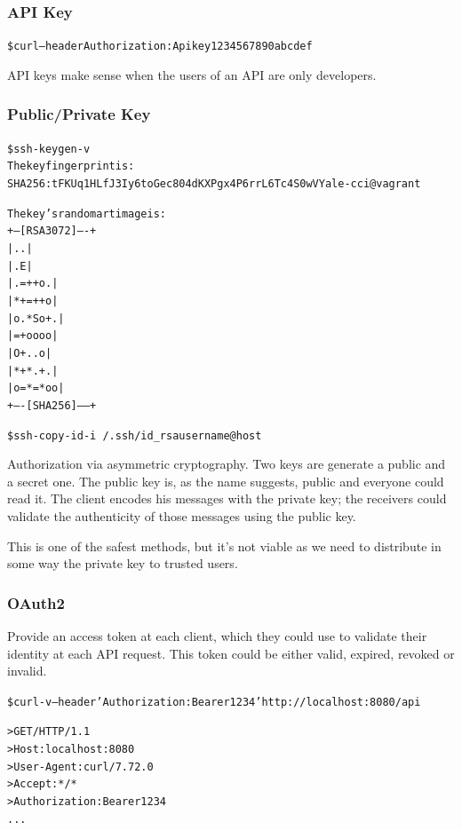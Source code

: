 \documentclass{style}
\begin{document}
\subsubsection{API Key}
\begin{alltt}
    \$ curl --header Authorization: Apikey 1234567890abcdef
\end{alltt}
API keys make sense when the users of an API are only developers.

\subsubsection{Public/Private Key}
\begin{alltt}
    \$ ssh-keygen -v
    The key fingerprint is:
    SHA256:tFKUq1HLfJ3Iy6toGec804dKXPgx4P6rrL6Tc4S0wVY ale-cci@vagrant

    The key's randomart image is:
    +---[RSA 3072]----+
    |        ..       |
    |       .E        |
    |     . =++ o .   |
    |      *+=++ o    |
    |     o.*So+.     |
    |      =+oooo     |
    |       O+..o     |
    |      *+*.+ .    |
    |     o=*=*oo     |
    +----[SHA256]-----+


    \$ ssh-copy-id -i ~/.ssh/id_rsa username@host
\end{alltt}
Authorization via asymmetric cryptography. Two keys are generate a public and a secret one.
The public key is, as the name suggests, public and everyone could read it.
The client encodes his messages with the private key; the receivers could validate the authenticity of those messages using the public key.

This is one of the safest methods, but it's not viable as we need to distribute in some way the private key to
trusted users.

\subsubsection{OAuth2}
Provide an access token at each client, which they could use to validate their
identity at each API request.  This token could be either valid, expired,
revoked or invalid.

\begin{alltt}
    \$ curl -v --header 'Authorization: Bearer 1234' http://localhost:8080/api

    > GET / HTTP/1.1
    > Host: localhost:8080
    > User-Agent: curl/7.72.0
    > Accept: */*
    > Authorization: Bearer 1234
    ...
\end{alltt}
\end{document}
